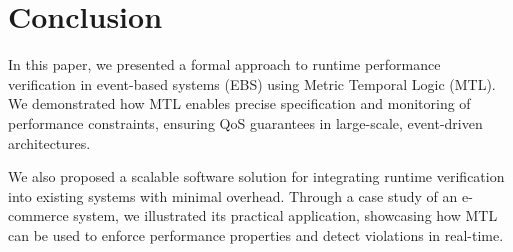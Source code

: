 \documentclass[twocolumn]{article}
\begin{document}
\section{Conclusion}
In this paper, we presented a formal approach to runtime performance verification in event-based systems (EBS) using Metric Temporal Logic (MTL). We demonstrated how MTL enables precise specification and monitoring of performance constraints, ensuring QoS guarantees in large-scale, event-driven architectures.

We also proposed a scalable software solution for integrating runtime verification into existing systems with minimal overhead. Through a case study of an e-commerce system, we illustrated its practical application, showcasing how MTL can be used to enforce performance properties and detect violations in real-time.




\end{document}
